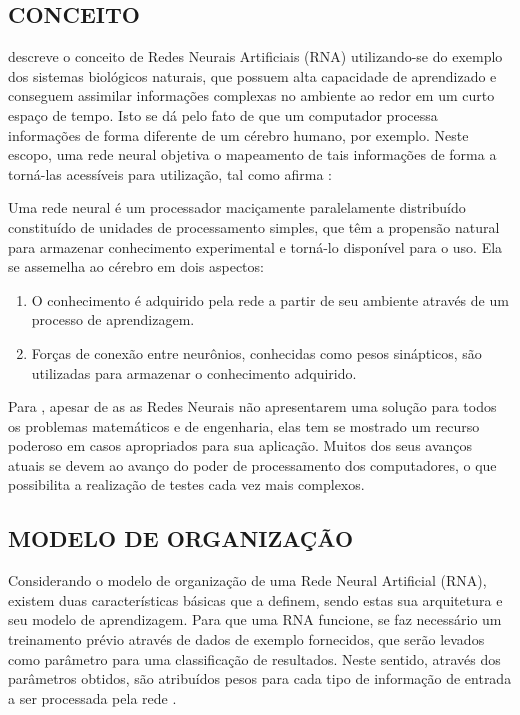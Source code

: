 \subsection{CONCEITO}

 descreve o conceito de Redes Neurais Artificiais (RNA) utilizando-se do exemplo dos sistemas biológicos naturais, que possuem alta capacidade de aprendizado e conseguem assimilar informações complexas no ambiente ao redor em um curto espaço de tempo. Isto se dá pelo fato de que um computador processa informações de forma diferente de um cérebro humano, por exemplo. Neste escopo, uma rede neural objetiva o mapeamento de tais informações de forma a torná-las acessíveis para utilização, tal como afirma :

\begin{citacao}
	Uma rede neural é um processador maciçamente paralelamente distribuído constituído de unidades de processamento simples, que têm a propensão natural para armazenar conhecimento experimental e torná-lo disponível para o uso. Ela se assemelha ao cérebro em dois aspectos:
	\begin{enumerate}[leftmargin=4.7cm, topsep=0cm]
	    \item O conhecimento é adquirido pela rede a partir de seu ambiente através de um processo de aprendizagem.
	    \item Forças de conexão entre neurônios, conhecidas como pesos sinápticos, são utilizadas para armazenar o conhecimento adquirido.
	\end{enumerate}
\end{citacao}

Para , apesar de as as Redes Neurais não apresentarem uma solução para todos os problemas matemáticos e de engenharia, elas tem se mostrado um recurso poderoso em casos apropriados para sua aplicação. Muitos dos seus avanços atuais se devem ao avanço do poder de processamento dos computadores, o que possibilita a realização de testes cada vez mais complexos.

\subsection{MODELO DE ORGANIZAÇÃO}

Considerando o modelo de organização de uma Rede Neural Artificial (RNA), existem duas características básicas que a definem, sendo estas sua arquitetura e seu modelo de aprendizagem. Para que uma RNA funcione, se faz necessário um treinamento prévio através de dados de exemplo fornecidos, que serão levados como parâmetro para uma classificação de resultados. Neste sentido, através dos parâmetros obtidos, são atribuídos pesos para cada tipo de informação de entrada a ser processada pela rede \cite{thomas2019}.

